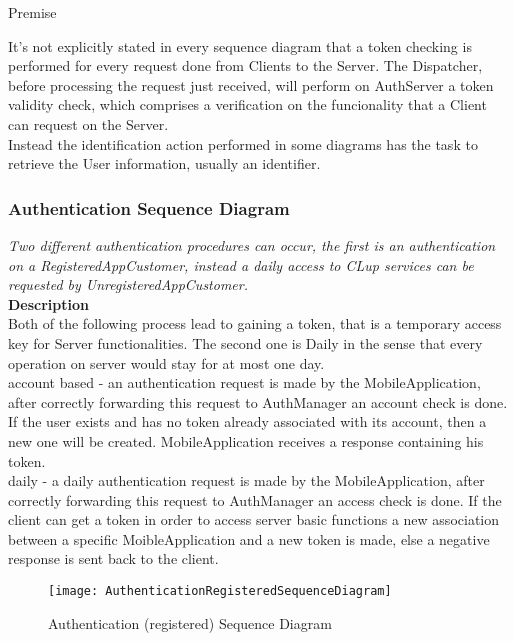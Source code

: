 \begin{center} 
Premise\\
\end{center}
It’s not explicitly stated in every sequence diagram that a token checking is performed for every request done from Clients to the Server. The Dispatcher, before processing the request just received, will perform on AuthServer a token validity check, which comprises a verification on the funcionality that a Client can request on the Server. \\ 
Instead the identification action performed in some diagrams has the task to retrieve the User information, usually an identifier.\\

\newpage
\subsubsection{Authentication Sequence Diagram}
\textit{Two different authentication procedures can occur, the first is an authentication on a RegisteredAppCustomer, instead a daily access to CLup services can be requested by UnregisteredAppCustomer.\\}
\textbf{Description\\}
Both of the following process lead to gaining a token, that is a temporary access key for Server functionalities. The second one is Daily in the sense that every operation on server would stay for at most one day.\\
account based - an authentication request is made by the MobileApplication, after correctly forwarding this request to AuthManager an account check is done. If the user exists and has no token already associated with its account, then a new one will be created. MobileApplication receives a response containing his token. \\
daily - a daily authentication request is made by the MobileApplication, after correctly forwarding this request to AuthManager an access check is done. If the client can get a token in order to access server basic functions a new association between a specific MoibleApplication and a new token is made, else a negative response is sent back to the client. \\

\begin{figure}[H]
 \centering
 \texttt{[image: AuthenticationRegisteredSequenceDiagram]}
 \caption{ Authentication (registered) Sequence Diagram}
 \end{figure}

